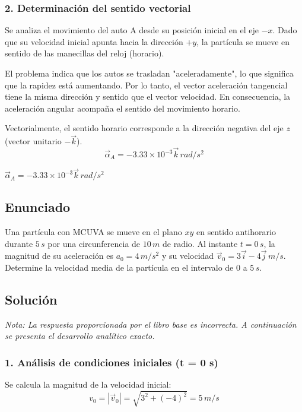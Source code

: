 \documentclass[12pt, a4paper]{article}
\begin{document}
\subsubsection*{2. Determinación del sentido vectorial}
Se analiza el movimiento del auto A desde su posición inicial en el eje $-x$.
Dado que su velocidad inicial apunta hacia la dirección $+y$, la partícula se mueve en sentido de las manecillas del reloj (horario).

El problema indica que los autos se trasladan "aceleradamente", lo que significa que la rapidez está aumentando. Por lo tanto, el vector aceleración tangencial tiene la misma dirección y sentido que el vector velocidad. En consecuencia, la aceleración angular acompaña el sentido del movimiento horario.

Vectorialmente, el sentido horario corresponde a la dirección negativa del eje $z$ (vector unitario $-\vec{k}$).
$$ \vec{\alpha}_A = -3.33 \times 10^{-3} \vec{k} \, \si{rad/s^2} $$

\begin{tcolorbox}[colback=green!5!white, colframe=green!50!black, title=Respuesta Final]
\centering \Large $\vec{\alpha}_A = -3.33 \times 10^{-3}\vec{k} \, \si{rad/s^2}$
\end{tcolorbox}

\newpage

\subsection*{Enunciado}
Una partícula con MCUVA se mueve en el plano $xy$ en sentido antihorario durante $5 \, \si{s}$ por una circunferencia de $10 \, \si{m}$ de radio. Al instante $t = 0 \, \si{s}$, la magnitud de su aceleración es $a_0 = 4 \, \si{m/s^2}$ y su velocidad $\vec{v}_0 = 3\vec{i} - 4\vec{j} \, \si{m/s}$. Determine la velocidad media de la partícula en el intervalo de $0$ a $5 \, \si{s}$. 

\subsection*{Solución}

\textit{Nota: La respuesta proporcionada por el libro base es incorrecta. A continuación se presenta el desarrollo analítico exacto.}

\subsubsection*{1. Análisis de condiciones iniciales (t = 0 s)}
Se calcula la magnitud de la velocidad inicial:
$$ v_0 = |\vec{v}_0| = \sqrt{3^2 + (-4)^2} = 5 \, \si{m/s} $$
\end{document}
